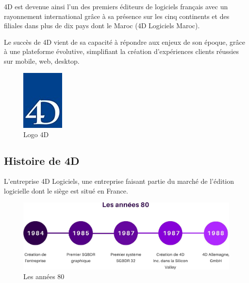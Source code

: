 4D est devenue ainsi l’un des premiers éditeurs de logiciels français avec un rayonnement international grâce à sa présence sur les cinq continents et des filiales dans plus de
dix pays dont le Maroc (4D Logiciels Maroc).
\newline

Le succès de 4D vient de sa capacité à répondre aux enjeux de son époque, grâce à
une plateforme évolutive, simplifiant la création d’expériences clients réussies sur mobile,
web, desktop.


\begin{figure}[h]
    \centering
    \includegraphics[scale=1.5]{Images/logo-4d.jpg} %
    \caption{Logo 4D}
    \label{fig:Logo4D}
\end{figure}




\subsection{Histoire de 4D}

L’entreprise 4D Logiciels, une entreprise faisant partie du marché de l’édition logicielle
dont le siège est situé en France.
\newline
\newline
\newline
\newline


\begin{figure}[h]
    \centering
    \includegraphics[scale=0.3]{Images/80.jpg} %
    \caption{Les années 80}
    \label{fig:Histoire80}
\end{figure}


